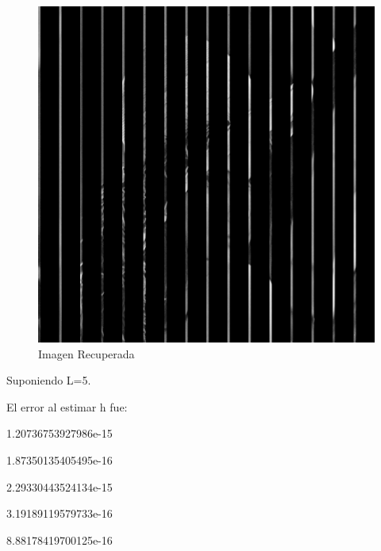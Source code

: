 \documentclass{article}
\begin{document}
\begin{multicols}{2}
\begin{figure}[H]
\centering
\includegraphics[scale=0.2]{../img/corrected_part6_3b.png}
\caption{Imagen Recuperada}

\end{figure}


\par \large{Suponiendo L=5.}

\par El error al estimar h fue:\\ 
\par   1.20736753927986e-15
\par   1.87350135405495e-16
\par   2.29330443524134e-15
\par   3.19189119579733e-16
\par   8.88178419700125e-16\\


\end{multicols}
\end{document}
